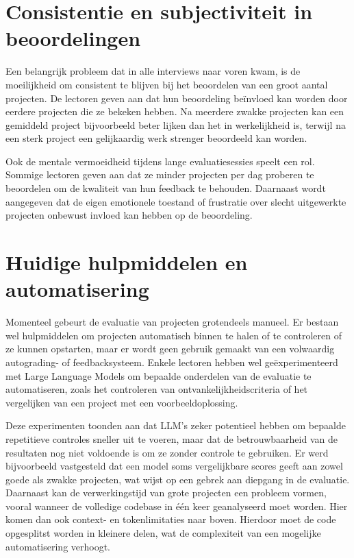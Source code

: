 \section{Consistentie en subjectiviteit in beoordelingen}

Een belangrijk probleem dat in alle interviews naar voren kwam, is de moeilijkheid om consistent te blijven bij het beoordelen van een groot aantal projecten. De lectoren geven aan dat hun beoordeling beïnvloed kan worden door eerdere projecten die ze bekeken hebben. Na meerdere zwakke projecten kan een gemiddeld project bijvoorbeeld beter lijken dan het in werkelijkheid is, terwijl na een sterk project een gelijkaardig werk strenger beoordeeld kan worden.

\vspace{1em}

Ook de mentale vermoeidheid tijdens lange evaluatiesessies speelt een rol. Sommige lectoren geven aan dat ze minder projecten per dag proberen te beoordelen om de kwaliteit van hun feedback te behouden. Daarnaast wordt aangegeven dat de eigen emotionele toestand of frustratie over slecht uitgewerkte projecten onbewust invloed kan hebben op de beoordeling.

\section{Huidige hulpmiddelen en automatisering}

Momenteel gebeurt de evaluatie van projecten grotendeels manueel. Er bestaan wel hulpmiddelen om projecten automatisch binnen te halen of te controleren of ze kunnen opstarten, maar er wordt geen gebruik gemaakt van een volwaardig autograding- of feedbacksysteem. Enkele lectoren hebben wel geëxperimenteerd met Large Language Models om bepaalde onderdelen van de evaluatie te automatiseren, zoals het controleren van ontvankelijkheidscriteria of het vergelijken van een project met een voorbeeldoplossing.

\vspace{1em}

Deze experimenten toonden aan dat LLM’s zeker potentieel hebben om bepaalde repetitieve controles sneller uit te voeren, maar dat de betrouwbaarheid van de resultaten nog niet voldoende is om ze zonder controle te gebruiken. Er werd bijvoorbeeld vastgesteld dat een model soms vergelijkbare scores geeft aan zowel goede als zwakke projecten, wat wijst op een gebrek aan diepgang in de evaluatie. Daarnaast kan de verwerkingstijd van grote projecten een probleem vormen, vooral wanneer de volledige codebase in één keer geanalyseerd moet worden. Hier komen dan ook context- en tokenlimitaties naar boven. Hierdoor moet de code opgesplitst worden in kleinere delen, wat de complexiteit van een mogelijke automatisering verhoogt.

